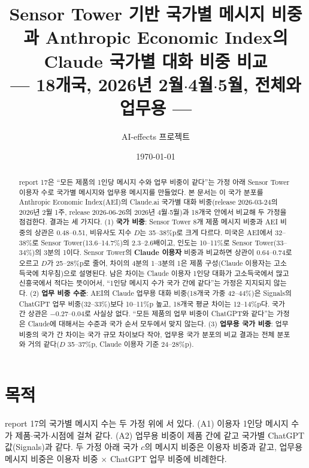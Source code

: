 \documentclass[11pt]{article}
\title{Sensor Tower 기반 국가별 메시지 비중과 Anthropic Economic Index의 Claude 국가별 대화 비중 비교\\[2mm]
\large --- 18개국, 2026년 2월$\cdot$4월$\cdot$5월, 전체와 업무용 ---}
\author{AI-effects 프로젝트}
\date{\today}
\begin{document}
\maketitle

\begin{abstract}
\noindent report 17은 ``모든 제품의 1인당 메시지 수와 업무 비중이 같다''는 가정 아래 Sensor Tower 이용자 수로 국가별 메시지와 업무용 메시지를 만들었다. 본 문서는 이 국가 분포를 Anthropic Economic Index(AEI)의 Claude.ai 국가별 대화 비중(release 2026-03-24의 2026년 2월 1주, release 2026-06-26의 2026년 4월$\cdot$5월)과 18개국 안에서 비교해 두 가정을 점검한다. 결과는 세 가지다. (1) \textbf{국가 비중}: Sensor Tower 8개 제품 메시지 비중과 AEI 비중의 상관은 0.48--0.51, 비유사도 지수 $D$는 35--38\%p로 크게 다르다. 미국은 AEI에서 32--38\%로 Sensor Tower(13.6--14.7\%)의 2.3--2.6배이고, 인도는 10--11\%로 Sensor Tower(33--34\%)의 3분의 1이다. Sensor Tower의 \textbf{Claude 이용자} 비중과 비교하면 상관이 0.64--0.74로 오르고 $D$가 25--28\%p로 줄어, 차이의 4분의 1--3분의 1은 제품 구성(Claude 이용자는 고소득국에 치우침)으로 설명된다. 남은 차이는 Claude 이용자 1인당 대화가 고소득국에서 많고 신흥국에서 적다는 뜻이어서, ``1인당 메시지 수가 국가 간에 같다''는 가정은 지지되지 않는다. (2) \textbf{업무 비중 수준}: AEI의 Claude 업무용 대화 비중(18개국 가중 42--44\%)은 Signals의 ChatGPT 업무 비중(32--33\%)보다 10--11\%p 높고, 18개국 평균 차이는 12--14\%p다. 국가 간 상관은 $-0.27$--$0.04$로 사실상 없다. ``모든 제품의 업무 비중이 ChatGPT와 같다''는 가정은 Claude에 대해서는 수준과 국가 순서 모두에서 맞지 않는다. (3) \textbf{업무용 국가 비중}: 업무 비중의 국가 간 차이는 국가 규모 차이보다 작아, 업무용 국가 분포의 비교 결과는 전체 분포와 거의 같다($D$ 35--37\%p, Claude 이용자 기준 24--28\%p).
\end{abstract}

\tableofcontents

\section{목적}

report 17의 국가별 메시지 수는 두 가정 위에 서 있다. (A1) 이용자 1인당 메시지 수가 제품$\cdot$국가$\cdot$시점에 걸쳐 같다. (A2) 업무용 비중이 제품 간에 같고 국가별 ChatGPT 값(Signals)과 같다. 두 가정 아래 국가 $c$의 메시지 비중은 이용자 비중과 같고, 업무용 메시지 비중은 이용자 비중 $\times$ ChatGPT 업무 비중에 비례한다.
\end{document}

